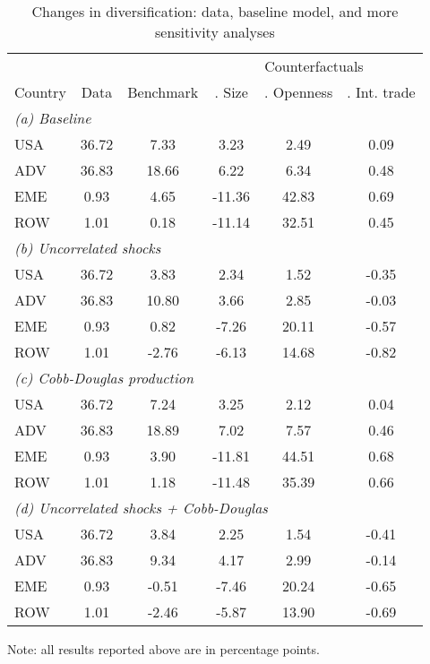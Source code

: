 \begin{table}[p]
\renewcommand{\arraystretch}{1.2}
\begin{center}
\begin{threeparttable}
\caption{Changes in diversification: data, baseline model, and more sensitivity analyses}
\label{tab:results-bal-div-sens2}
\begin{tabular}{l c c c c c}
\toprule
& & & \multicolumn{3}{c}{Counterfactuals}\\
\cmidrule(rl){4-6}
Country & \multicolumn{1}{p{2.1cm}}{\centering Data} & \multicolumn{1}{p{2.1cm}}{\centering Benchmark} & \multicolumn{1}{p{2.1cm}}{\centering 1. Size} & \multicolumn{1}{p{2.1cm}}{\centering 2. Openness} & \multicolumn{1}{p{2.1cm}}{\centering 3. Int. trade}\\
\midrule
\multicolumn{6}{l}{\textit{(a) Baseline}}\\
USA& 36.72&7.33&3.23&2.49&0.09\\
ADV& 36.83&18.66&6.22&6.34&0.48\\
EME& 0.93&4.65&-11.36&42.83&0.69\\
ROW& 1.01&0.18&-11.14&32.51&0.45\\
\midrule
\multicolumn{6}{l}{\textit{(b) Uncorrelated shocks}}\\
USA& 36.72&3.83&2.34&1.52&-0.35\\
ADV& 36.83&10.80&3.66&2.85&-0.03\\
EME& 0.93&0.82&-7.26&20.11&-0.57\\
ROW& 1.01&-2.76&-6.13&14.68&-0.82\\
\midrule
\multicolumn{6}{l}{\textit{(c) Cobb-Douglas production}}\\
USA& 36.72&7.24&3.25&2.12&0.04\\
ADV& 36.83&18.89&7.02&7.57&0.46\\
EME& 0.93&3.90&-11.81&44.51&0.68\\
ROW& 1.01&1.18&-11.48&35.39&0.66\\
\midrule
\multicolumn{6}{l}{\textit{(d) Uncorrelated shocks + Cobb-Douglas}}\\
USA& 36.72&3.84&2.25&1.54&-0.41\\
ADV& 36.83&9.34&4.17&2.99&-0.14\\
EME& 0.93&-0.51&-7.46&20.24&-0.65\\
ROW& 1.01&-2.46&-5.87&13.90&-0.69\\
\bottomrule
\end{tabular}
\normalsize
\begin{tablenotes}
\small
\item Note: all results reported above are in percentage points.
\normalsize
\end{tablenotes}
\end{threeparttable}
\end{center}
\end{table}
